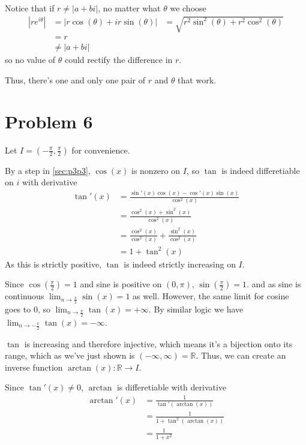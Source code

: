 \documentclass[12pt]{article}
\newcommand{\R}{\mathbb{R}}
\begin{document}
Notice that if $r \ne |a+bi|$, no matter what $\theta$ we choose
\begin{align*}
  \left|re^{i\theta}\right|
   & = \left|r\cos(\theta)+ir\sin(\theta)\right|
   & = \sqrt{r^2\sin^2(\theta)+r^2\cos^2(\theta)} \\
   & = r                                          \\
   & \ne |a+bi|
\end{align*}
so no value of $\theta$ could rectify the difference in $r$.

Thus, there's one and only one pair of $r$ and $\theta$ that work.

\pagebreak

\section{Problem 6}

Let $I=\left(-\frac{\pi}{2}, \frac{\pi}{2}\right)$ for convenience.

By a step in \ref{sec:p3p3}, $\cos(x)$ is nonzero on $I$, so
$\tan$ is indeed differetiable on $i$ with derivative
\begin{align*}
  \tan'(x)
   & = \frac{\sin'(x)\cos(x)-\cos'(x)\sin(x)}{\cos^2(x)}       \\
   & = \frac{\cos^2(x)+\sin^2(x)}{\cos^2(x)}                   \\
   & = \frac{\cos^2(x)}{\cos^2(x)}+\frac{\sin^2(x)}{\cos^2(x)} \\
   & = 1+\tan^2(x)
\end{align*}
As this is strictly positive, $\tan$ is indeed strictly increasing on $I$.

Since $\cos\left(\frac{\pi}{2}\right)=1$
and sine is positive on $(0, \pi)$, $\sin\left(\frac{\pi}{2}\right)=1$.
and as sine is continuous $\lim_{n \to \frac{\pi}{2}} \sin(x) = 1$ as well.
However, the same limit for cosine goes to $0$, so $\lim_{n \to \frac{\pi}{2}} \tan(x)=+\infty$.
By similar logic we have $\lim_{n \to -\frac{\pi}{2}} \tan(x)=-\infty$.

$\tan$ is increasing and therefore injective, which means it's a bijection onto its range,
which as we've just shown is $(-\infty, \infty)=\R$.
Thus, we can create an inverse function $\arctan(x): \R \to I$.

Since $\tan'(x) \ne 0$, $\arctan$ is differetiable with derivative
\begin{align*}
  \arctan'(x)
   & =\frac{1}{\tan'(\arctan(x))}    \\
   & =\frac{1}{1+\tan^2(\arctan(x))} \\
   & =\frac{1}{1+x^2}
\end{align*}
\end{document}
